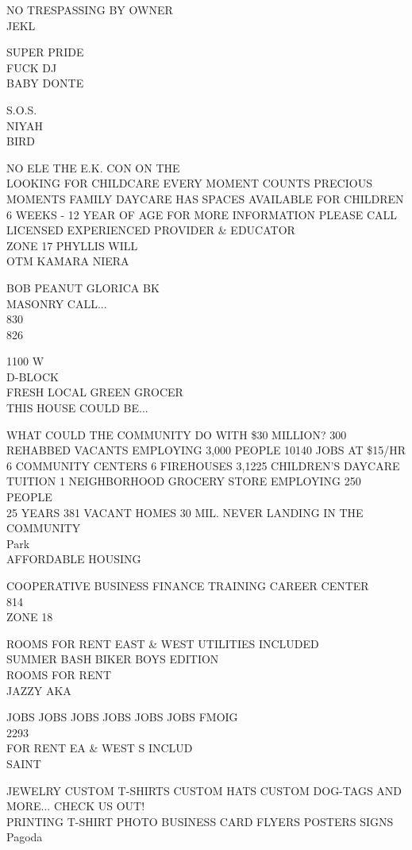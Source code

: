 \documentclass[10pt,letterpaper]{article}
\begin{document}
NO TRESPASSING BY OWNER\\
JEKL

SUPER PRIDE\\
FUCK DJ\\
BABY DONTE

S.O.S.\\
NIYAH\\
BIRD

NO ELE THE E.K. CON ON THE\\
LOOKING FOR CHILDCARE EVERY MOMENT COUNTS PRECIOUS MOMENTS FAMILY DAYCARE HAS SPACES AVAILABLE FOR CHILDREN 6 WEEKS {-} 12 YEAR OF AGE FOR MORE INFORMATION PLEASE CALL LICENSED EXPERIENCED PROVIDER \& EDUCATOR\\
ZONE 17 PHYLLIS WILL\\
OTM KAMARA NIERA

BOB PEANUT GLORICA BK\\
MASONRY CALL...\\
830\\
826

1100 W\\
D{-}BLOCK\\
FRESH LOCAL GREEN GROCER\\
THIS HOUSE COULD BE...

WHAT COULD THE COMMUNITY DO WITH \$30 MILLION?  300 REHABBED VACANTS EMPLOYING 3,000 PEOPLE 10140 JOBS AT \$15/HR 6 COMMUNITY CENTERS 6 FIREHOUSES 3,1225 CHILDREN'S DAYCARE TUITION 1 NEIGHBORHOOD GROCERY STORE EMPLOYING 250 PEOPLE\\
25 YEARS 381 VACANT HOMES 30 MIL. NEVER LANDING IN THE COMMUNITY\\
Park\\
AFFORDABLE HOUSING

COOPERATIVE BUSINESS FINANCE TRAINING CAREER CENTER\\
814\\
ZONE 18

ROOMS FOR RENT EAST \& WEST UTILITIES INCLUDED\\
SUMMER BASH BIKER BOYS EDITION\\
ROOMS FOR RENT\\
JAZZY AKA

JOBS JOBS JOBS JOBS JOBS JOBS FMOIG\\
2293\\
FOR RENT EA \& WEST S INCLUD\\
SAINT

JEWELRY CUSTOM T{-}SHIRTS CUSTOM HATS CUSTOM DOG{-}TAGS AND MORE... CHECK US OUT!\\
PRINTING T{-}SHIRT PHOTO BUSINESS CARD FLYERS POSTERS SIGNS\\
Pagoda
\end{document}
